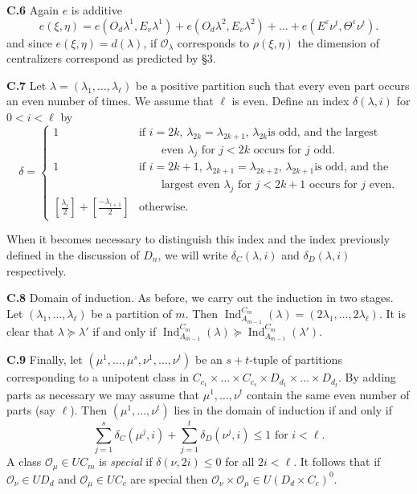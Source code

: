 \documentclass{amsart}
\newcommand\Am		{A_{m-1}}
\newcommand\eps	{\varepsilon}
\newcommand\Ind	{\operatorname{Ind}}
\newcommand\lam	{\lambda}
\newcommand\lams	{(\lam_1,\dots,\lam_\ell)}
\newcommand\cO		{{\mathcal O}}
\newcommand\rhoxi	{\rho(\xi,\eta)}
\begin{document}
\noindent
{\bf C.6} \qquad Again $e$ is additive
	$$
	e(\xi,\eta) = e(O_d\lam^1,E_v \lam^1) + e(O_d\lam^2,E_v \lam^2) +\dots+
	e(E^\eps\nu^t, \Theta^\eps\nu^t).
	$$
and since $e(\xi,\eta) = d(\lam)$, if $\cO_\lam$ corresponds to $\rhoxi$ the 
dimension of centralizers correspond as predicted by \S 3.


\noindent
{\bf C.7} \qquad Let $\lam = \lams$ be a positive partition such that every
even part occurs an even number of times.  We assume that $\ell$ is even.
Define an index $\delta(\lam,i)$ for $0 < i < \ell$ by
	$$
\delta = \begin{cases} 
1 &\text{if $i=2k$, $\lam_{2k} = \lam_{2k+1}$, $\lam_{2k}$
is odd, and the largest} \\
&\qquad \text{even $\lam_j$ for $j < 2k$ occurs for $j$ odd.} \\
1 &\text{if $i=2k+1$, $\lam_{2k+1} = \lam_{2k+2}$, $\lam_{2k+1}$
is odd, and the} \\ 
&\qquad \text{largest even $\lam_j$ for $j < 2k+1$ occurs 
for $j$ even.} \\
\left[ \textstyle{\frac{\lam_i}{2}} \right] + 
\left[ \textstyle{\frac{-\lam_{i+1}}{2}} \right] &\text{otherwise.}
\end{cases}
	$$

When it becomes necessary to distinguish this index and the index previously
defined in the discussion of $D_n$, we will write $\delta_C(\lam,i)$ and
$\delta_D(\lam,i)$ respectively.

\noindent
{\bf C.8} \qquad Domain of induction.  As before, we carry out the 
induction in two stages.  Let $\lams$ be a partition of $m$.  
Then $\Ind_{{\Am}}^{C_m} (\lam) = (2\lam_1 ,\dots, 2\lam_\ell)$.  It is
clear that $\lam \succeq \lam'$ if and only if 
$\Ind_{{\Am}}^{C_m} (\lam) \succeq \Ind_{{\Am}}^{C_m} (\lam')$. 
	
\noindent
{\bf C.9} \qquad Finally, let 
$(\mu^1 ,\dots, \mu^s,\nu^1 ,\dots, \nu^t)$ be an $s+t$-tuple of 
partitions corresponding to a unipotent class in 
$C_{c_1} \times\dots\times C_{c_s} \times D_{d_1} \times\dots\times D_{d_t}$.
By adding
parts as necessary we may assume that $\mu^1 ,\dots, \nu^t$ contain the
same even number of parts (say $\ell$).  Then $(\mu^1 ,\dots, \nu^t)$ lies 
in the domain of induction if and only if 
	$$
	\sum_{j=1}^s \delta_C (\mu^j,i) +
	\sum_{j=1}^t \delta_D (\nu^j,i) \le 1 \text{ for } i < \ell.
	$$
A class $\cO_\mu \in UC_m$ is {\it special\/} if
$\delta(\nu,2i) \le 0$ for all $2i < \ell$.  It follows that if
$\cO_\nu \in UD_d$ and $\cO_\mu \in UC_c$ are special then 
$\cO_\nu \times \cO_\mu \in U(D_d \times C_c)^0$.
\end{document}
